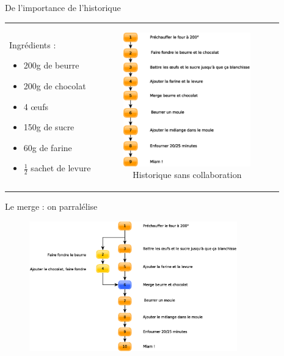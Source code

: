 \documentclass[xcolor=x11names,compress]{beamer}
\begin{document}
\begin{frame}{De l'importance de l'historique}
	\begin{tabular}{lc}
	\begin{minipage}{0.4\textwidth}
	Ingrédients : 
	\begin{itemize}
		\item 200g de beurre
		\item 200g de chocolat
		\item 4 œufs
		\item 150g de sucre
		\item 60g de farine
		\item $\frac{1}{2}$ sachet de levure
	\end{itemize}
	\end{minipage}
	&
	\begin{minipage}{0.6\textwidth}
		\begin{figure}[H]
			\includegraphics[width=5.5cm]{images/3-collaboration/sansbranche.eps}
			\caption{Historique sans collaboration}
		\end{figure}
	\end{minipage}
	\end{tabular}

\end{frame}
\begin{frame}{Le merge : on parralélise}
	\begin{figure}[H]
		\includegraphics[width=9cm]{images/3-collaboration/merge.eps}
	\end{figure}
\end{frame}
\end{document}
